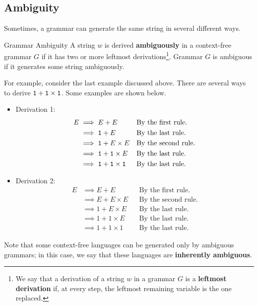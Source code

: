 \documentclass[letterpaper]{article}
\begin{document}
\subsection{Ambiguity}
Sometimes, a grammar can generate the same string in several different ways.
\begin{definition}{Grammar Ambiguity}{}
    A string $w$ is derived \textbf{ambiguously} in a context-free grammar $G$ if it has two or more leftmost derivations\footnote{We say that a derivation of a string $w$ in a grammar $G$ is a \textbf{leftmost derivation} if, at every step, the leftmost remaining variable is the one replaced.}. Grammar $G$ is ambiguous if it generates some string ambiguously.
\end{definition}
For example, consider the last example discussed above. There are several ways to derive $\texttt{1} + \texttt{1} \times \texttt{1}$. Some examples are shown below. 
\begin{mdframed}[]
    \begin{itemize}
        \item Derivation 1:
        \begin{equation*}
            \begin{aligned}
                E &\implies E + E && \text{By the first rule.} \\ 
                    &\implies \texttt{1} + E && \text{By the last rule.} \\ 
                    &\implies \texttt{1} + E \times E && \text{By the second rule.} \\ 
                    &\implies \texttt{1} + \texttt{1} \times E && \text{By the last rule.} \\ 
                    &\implies \texttt{1} + \texttt{1} \times \texttt{1} && \text{By the last rule.}
            \end{aligned}
        \end{equation*}

        \item Derivation 2: 
        \begin{equation*}
            \begin{aligned}
                E &\implies E + E && \text{By the first rule.} \\ 
                    &\implies E + E \times E && \text{By the second rule.} \\ 
                    &\implies 1 + E \times E && \text{By the last rule.} \\ 
                    &\implies 1 + 1 \times E && \text{By the last rule.} \\ 
                    &\implies 1 + 1 \times 1 && \text{By the last rule.}
            \end{aligned}
        \end{equation*}
    \end{itemize}
\end{mdframed}
Note that some context-free languages can be generated only by ambiguous grammars; in this case, we say that these languages are \textbf{inherently ambiguous}.
\end{document}
